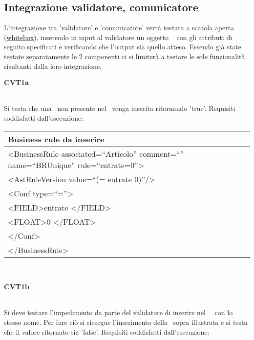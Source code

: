 \subsection{Integrazione validatore, comunicatore}
L'integrazione tra 'validatore' e 'comunicatore' verr\`a testata a scatola aperta (\underline{whitebox}), inserendo in input al validatore un oggetto \textit{\br\ } con gli attributi di seguito specificati e verificando che l'output sia quello atteso. Essendo gi\`a state testate separatamente le 2 componenti ci si limiter\`a a testare le sole funzionalit\`a risultanti dalla loro integrazione.\\

\begin{Large}\textbf{CVT1a}\end{Large} \\
Si testa che una \br\ non presente nel \rp\ venga inserita ritornando 'true'.
Requisiti soddisfatti dall'esecuzione: \\
\begin{center}
\begin{tabular}{|p{11cm}|} \hline
\textbf{Business rule da inserire}\\ \hline
\textless BusinessRule associated=``Articolo'' comment=``'' name=``BRUnique'' rule=``entrate=0''\textgreater \\
\textless AstRuleVersion value=``(= entrate 0)''/\textgreater \\
 \textless Conf type=``=''\textgreater \\
 \textless FIELD\textgreater entrate \textless /FIELD\textgreater \\
 \textless FLOAT\textgreater 0 \textless /FLOAT\textgreater \\
 \textless /Conf\textgreater \\
\textless /BusinessRule\textgreater \\ \hline
\end{tabular} \\
\end{center}

\begin{Large}\textbf{CVT1b}\end{Large} \\
Si deve testare l'impedimento da parte del validatore di inserire nel \rp\ \br\ con lo stesso nome. Per fare ci\`o si riesegue l'inserimento della \br\ sopra illustrata e si testa che il valore ritornato sia 'false'.
Requisiti soddisfatti dall'esecuzione: \\
 \\
